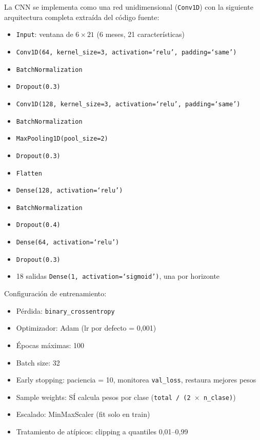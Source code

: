 La CNN se implementa como una red unidimensional (\texttt{Conv1D}) con la siguiente arquitectura completa extraída del código fuente:

\begin{itemize}
    \item \texttt{Input}: ventana de $6 \times 21$ (6 meses, 21 características)
    \item \texttt{Conv1D(64, kernel\_size=3, activation=`relu', padding=`same')}
    \item \texttt{BatchNormalization}
    \item \texttt{Dropout(0.3)}
    \item \texttt{Conv1D(128, kernel\_size=3, activation=`relu', padding=`same')}
    \item \texttt{BatchNormalization}
    \item \texttt{MaxPooling1D(pool\_size=2)}
    \item \texttt{Dropout(0.3)}
    \item \texttt{Flatten}
    \item \texttt{Dense(128, activation=`relu')}
    \item \texttt{BatchNormalization}
    \item \texttt{Dropout(0.4)}
    \item \texttt{Dense(64, activation=`relu')}
    \item \texttt{Dropout(0.3)}
    \item 18 salidas \texttt{Dense(1, activation=`sigmoid')}, una por horizonte
\end{itemize}

Configuración de entrenamiento:

\begin{itemize}
    \item Pérdida: \texttt{binary\_crossentropy}
    \item Optimizador: Adam (lr por defecto = 0,001)
    \item Épocas máximas: 100
    \item Batch size: 32
    \item Early stopping: paciencia = 10, monitorea \texttt{val\_loss}, restaura mejores pesos
    \item Sample weights: SÍ calcula pesos por clase (\texttt{total / (2 $\times$ n\_clase)})
    \item Escalado: MinMaxScaler (fit solo en train)
    \item Tratamiento de atípicos: clipping a quantiles 0,01--0,99
\end{itemize}

